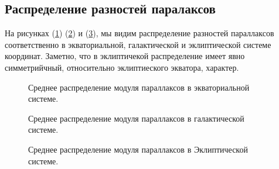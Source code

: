 \documentclass[14pt]{article} %
\begin{document}
\subsection{Распределение разностей паралаксов}\label{sub:smthhealpix}

На рисунках (\ref{img:sf_ra}) (\ref{img:sf_l}) и (\ref{img:sf_lo}), мы видим распределение разностей параллаксов соответственно в экваториальной, галактической и эклиптической системе координат. Заметно, что в эклиптичекой распределение имеет явно симметрийчный, относительно эклиптиеского экватора, характер.

\begin{figure}[h!]
\caption{Среднее распределение модуля параллаксов в экваториальной системе.}
\label{img:sf_ra}
\end{figure}
\begin{figure}[h!]
\caption{Среднее распределение модуля параллаксов в галактической системе.}
\label{img:sf_l}
\end{figure}
\begin{figure}[h!]
\caption{Среднее распределение модуля параллаксов в Эклиптической системе.}
\label{img:sf_lo}
\end{figure}
\end{document}
